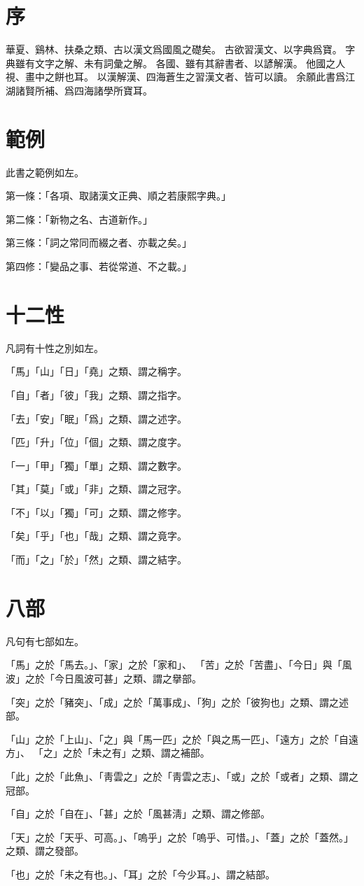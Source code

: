 \section{序}
華夏、鷄林、扶桑之類、古以漢文爲國風之礎矣。
古欲習漢文、以字典爲寶。
字典雖有文字之解、未有詞彙之解。
各國、雖有其辭書者、以諺解漢。
他國之人視、畫中之餅也耳。
以漢解漢、四海蒼生之習漢文者、皆可以讀。
余願此書爲江湖諸賢所補、爲四海諸學所寶耳。
\section{範例}
此書之範例如左。
\par 第一條：「各項、取諸漢文正典、順之若康熙字典。」
\par 第二條：「新物之名、古道新作。」
\par 第三條：「詞之常同而綴之者、亦載之矣。」
\par 第四修：「變品之事、若從常道、不之載。」
\section{十二性}
\par 凡詞有十性之別如左。
\par 「馬」「山」「日」「堯」之類、謂之稱字。
\par 「自」「者」「彼」「我」之類、謂之指字。
\par 「去」「安」「眠」「爲」之類、謂之述字。
\par 「匹」「升」「位」「個」之類、謂之度字。
\par 「一」「甲」「獨」「單」之類、謂之數字。
\par 「其」「莫」「或」「非」之類、謂之冠字。
\par 「不」「以」「獨」「可」之類、謂之修字。
\par 「矣」「乎」「也」「哉」之類、謂之竟字。
\par 「而」「之」「於」「然」之類、謂之結字。
\section{八部}
\par 凡句有七部如左。
\par 「馬」之於「馬去。」、「家」之於「家和」、
「苦」之於「苦盡」、「今日」與「風波」之於「今日風波可甚」之類、謂之擧部。
\par 「突」之於「豬突」、「成」之於「萬事成」、「狗」之於「彼狗也」之類、謂之述部。
\par 「山」之於「上山」、「之」與「馬一匹」之於「與之馬一匹」、「遠方」之於「自遠方」、
「之」之於「未之有」之類、謂之補部。
\par 「此」之於「此魚」、「靑雲之」之於「靑雲之志」、「或」之於「或者」之類、謂之冠部。
\par 「自」之於「自在」、「甚」之於「風甚淸」之類、謂之修部。
\par 「天」之於「天乎、可高。」、「嗚乎」之於「嗚乎、可惜。」、「蓋」之於「蓋然。」之類、謂之發部。
\par 「也」之於「未之有也。」、「耳」之於「今少耳。」、謂之結部。
